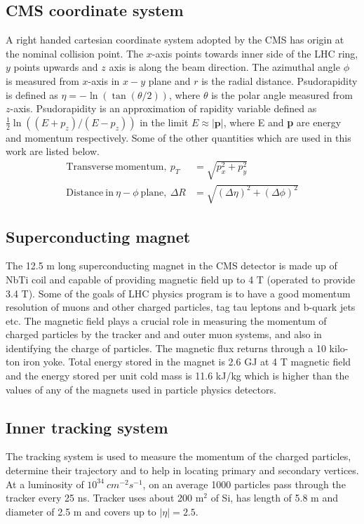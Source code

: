 \subsection{CMS coordinate system}
A right handed cartesian coordinate system adopted by the CMS has origin at the nominal collision point. The $x$-axis points towards inner side of the LHC ring, $y$ points upwards and $z$ axis is along the beam direction. The azimuthal angle $\phi$ is measured from $x$-axis in $x-y$ plane and $r$ is the radial distance. Psudorapidity is defined as $\eta = - \ln(\tan(\theta/2))$, where $\theta$ is the polar angle measured from $z$-axis. Psudorapidity is an approximation of rapidity variable defined as $\frac{1}{2}\ln((E+p_z)/(E-p_z))$ in the limit $E\approx |\textbf{p}|$, where E and \textbf{p} are energy and momentum respectively. Some of the other quantities which are used in this work are listed below.
\begin{align}
\mathrm{Transverse\ momentum,\ } p_T & = \sqrt{p_{x}^2 + p_{y}^2}\\
\mathrm{Distance\ in\ }\eta-\phi \ \mathrm{plane,}\ \Delta R & = \sqrt{(\Delta \eta)^2 + (\Delta \phi)^2}
\end{align}

\subsection{Superconducting magnet}
The 12.5 m long superconducting magnet in the CMS detector is made up of NbTi coil and capable of providing magnetic field up to 4 T (operated to provide 3.4 T). Some of the goals of LHC physics program is to have a good momentum resolution of muons and other charged particles, tag tau leptons and b-quark jets etc. The magnetic field plays a crucial role in measuring the momentum of charged particles by the tracker and and outer muon systems, and also in identifying the charge of particles. The magnetic flux returns through a 10 kilo-ton iron yoke. Total energy stored in the magnet is 2.6 GJ at 4 T magnetic field and the energy stored per unit cold mass is 11.6 kJ/kg which is higher than the values of any of the magnets used in particle physics detectors.
\subsection{Inner tracking system}
The tracking system is used to measure the momentum of the charged particles, determine their trajectory and to help in locating primary and secondary vertices. At a luminosity of $10^{34}\ cm^{-2}s^{-1}$, on an average 1000 particles pass through the tracker every 25 ns. Tracker uses about 200 m$^2$ of Si, has length of 5.8 m and diameter of 2.5 m and covers up to $|\eta| = 2.5$. 

